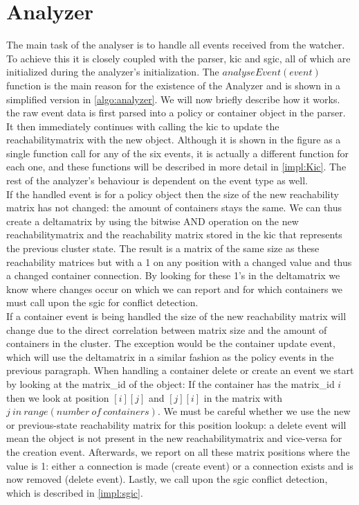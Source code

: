 \section{Analyzer} \label{impl:analyzer} The main task of the analyser is to handle all events received from the watcher. To achieve this it is closely coupled with the parser, \acrlong{kic} and \acrlong{sgic}, all of which are initialized during the analyzer's initialization. The $analyseEvent(event)$ function is the main reason for the existence of the Analyzer and is shown in a simplified version in \autoref{algo:analyzer}. We will now briefly describe how it works.
\\[10pt]
the raw event data is first parsed into a policy or container object in the parser. It then immediately continues with calling the \acrshort{kic} to update the reachabilitymatrix with the new object. Although it is shown in the figure as a single function call for any of the six events, it is actually a different function for each one, and these functions will be described in more detail in \autoref{impl:Kic}. The rest of the analyzer's behaviour is dependent on the event type as well.
\\[10pt]
If the handled event is for a policy object then the size of the new reachability matrix has not changed: the amount of containers stays the same. We can thus create a deltamatrix by using the bitwise AND operation on the new reachabilitymatrix and the reachability matrix stored in the \acrshort{kic} that represents the previous cluster state. The result is a matrix of the same size as these reachability matrices but with a 1 on any position with a changed value and thus a changed container connection. By looking for these 1's in the deltamatrix we know where changes occur on which we can report and for which containers we must call upon the \acrshort{sgic} for conflict detection.
\\[10pt]
If a container event is being handled the size of the new reachability matrix will change due to the direct correlation between matrix size and the amount of containers in the cluster. The exception would be the container update event, which will use the deltamatrix in a similar fashion as the policy events in the previous paragraph. When handling a container delete or create an event we start by looking at the matrix\_id of the object: If the container has the matrix\_id $i$ then we look at position $[i][j]$ and $[j][i]$ in the matrix with $j\ in\ range(number\ of\ containers)$. We must be careful whether we use the new or previous-state reachability matrix for this position lookup: a delete event will mean the object is not present in the new reachabilitymatrix and vice-versa for the creation event. Afterwards, we report on all these matrix positions where the value is 1: either a connection is made (create event) or a connection exists and is now removed (delete event). Lastly, we call upon the \acrshort{sgic} conflict detection, which is described in \autoref{impl:sgic}.

